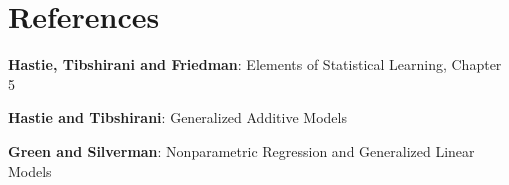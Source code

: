 \section{References}
%
%
\begin{frame}
  \textbf{Hastie, Tibshirani and Friedman}: Elements of Statistical Learning, Chapter 5

  \textbf{Hastie and Tibshirani}: Generalized Additive Models

  \textbf{Green and Silverman}: Nonparametric Regression and Generalized Linear Models
\end{frame}
